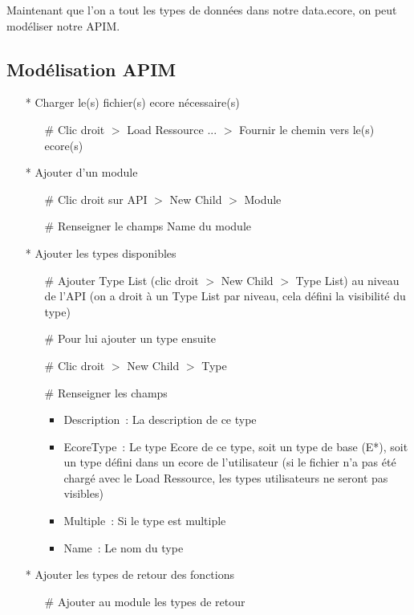 \documentclass{article}
\begin{document}
Maintenant que l'on a tout les types de donn\'ees dans notre data.ecore, on peut mod\'eliser notre APIM.

\subsection*{Mod\'elisation APIM}

\begin{itemize}
\item[*] Charger le(s) fichier(s) ecore n\'ecessaire(s)
  \begin{itemize}
  \item[\#] Clic droit $>$ Load Ressource ... $>$ Fournir le chemin vers le(s) ecore(s)
  \end{itemize}
\item[*] Ajouter d'un module
  \begin{itemize}
  \item[\#] Clic droit sur API $>$ New Child $>$ Module
  \item[\#] Renseigner le champs Name du module
  \end{itemize}
\item[*] Ajouter les types disponibles
  \begin{itemize}
  \item[\#] Ajouter Type List (clic droit $>$ New Child $>$ Type List) au niveau de l'API (on a droit \`a un Type List par niveau, cela d\'efini la visibilit\'e du type)
  \item[\#] Pour lui ajouter un type ensuite
  \item[\#] Clic droit $>$ New Child $>$ Type
  \item[\#] Renseigner les champs
    \begin{itemize}
    \item Description~: La description de ce type
    \item EcoreType~: Le type Ecore de ce type, soit un type de base (E*), soit un type d\'efini dans un ecore de l'utilisateur (si le fichier n'a pas \'et\'e charg\'e avec le Load Ressource, les types utilisateurs ne seront pas visibles)
    \item Multiple~: Si le type est multiple
    \item Name~: Le nom du type
    \end{itemize}
  \end{itemize}
\item[*] Ajouter les types de retour des fonctions
  \begin{itemize}
  \item[\#] Ajouter au module les types de retour

\end{itemize}
\end{itemize}
\end{document}

